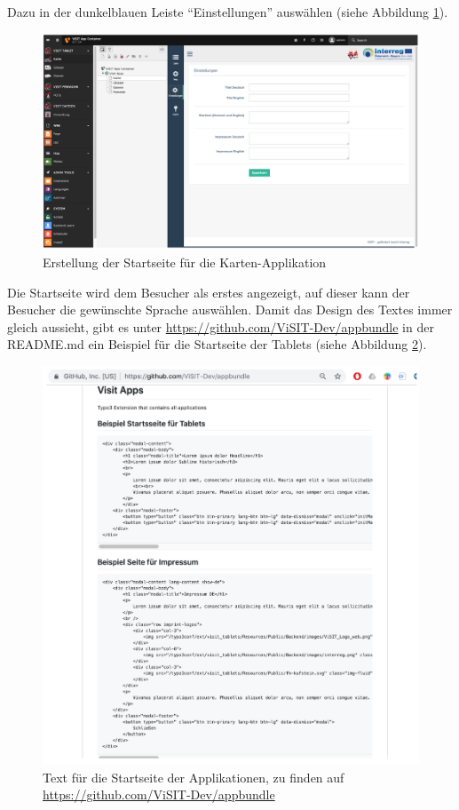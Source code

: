 Dazu in der dunkelblauen Leiste “Einstellungen” auswählen (siehe Abbildung \ref{img:startseite_karte}).

\begin{figure}[ht!]
\centering
\includegraphics[width=12cm]{Figures/paula/karte/startseite_karte.png}
\caption{Erstellung der Startseite für die Karten-Applikation}
\label{img:startseite_karte}
\end{figure}

Die Startseite wird dem Besucher als erstes angezeigt, auf dieser kann der Besucher die gewünschte Sprache auswählen. Damit das Design des Textes immer gleich aussieht, gibt es unter \url{https://github.com/ViSIT-Dev/appbundle} in der README.md ein Beispiel für die Startseite der Tablets (siehe Abbildung \ref{img:github_link}).

\begin{figure}[ht!]
\centering
\includegraphics[width=12cm]{Figures/paula/karte/github_link.png}
\caption{Text für die Startseite der Applikationen, zu finden auf \url{https://github.com/ViSIT-Dev/appbundle}}
\label{img:github_link}
\end{figure}

